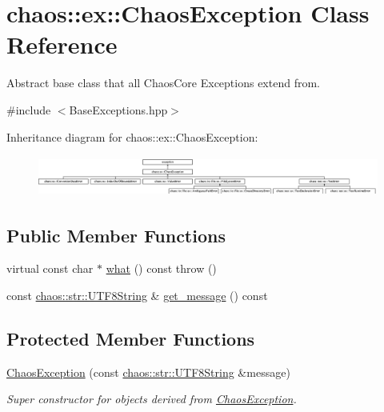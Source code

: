 \hypertarget{classchaos_1_1ex_1_1_chaos_exception}{}\section{chaos\+:\+:ex\+:\+:Chaos\+Exception Class Reference}
\label{classchaos_1_1ex_1_1_chaos_exception}


Abstract base class that all Chaos\+Core Exceptions extend from.  




{\ttfamily \#include $<$Base\+Exceptions.\+hpp$>$}

Inheritance diagram for chaos\+:\+:ex\+:\+:Chaos\+Exception\+:\begin{figure}[H]
\begin{center}
\leavevmode
\includegraphics[height=1.338912cm]{classchaos_1_1ex_1_1_chaos_exception}
\end{center}
\end{figure}
\subsection*{Public Member Functions}
\begin{DoxyCompactItemize}
\item 
virtual const char $\ast$ \hyperlink{classchaos_1_1ex_1_1_chaos_exception_a5266c5ba1e7b6ab2bbfcb2a6c01fafea}{what} () const   throw ()
\item 
const \hyperlink{classchaos_1_1str_1_1_u_t_f8_string}{chaos\+::str\+::\+U\+T\+F8\+String} \& \hyperlink{classchaos_1_1ex_1_1_chaos_exception_a944fe85435124a77c0b49149e7eadc12}{get\+\_\+message} () const 
\end{DoxyCompactItemize}
\subsection*{Protected Member Functions}
\begin{DoxyCompactItemize}
\item 
\hyperlink{classchaos_1_1ex_1_1_chaos_exception_af0bdefc632dbd0fd039d7af6b2a9e52b}{Chaos\+Exception} (const \hyperlink{classchaos_1_1str_1_1_u_t_f8_string}{chaos\+::str\+::\+U\+T\+F8\+String} \&message)
\begin{DoxyCompactList}\small\item\em Super constructor for objects derived from \hyperlink{classchaos_1_1ex_1_1_chaos_exception}{Chaos\+Exception}. \end{DoxyCompactList}\end{DoxyCompactItemize}


